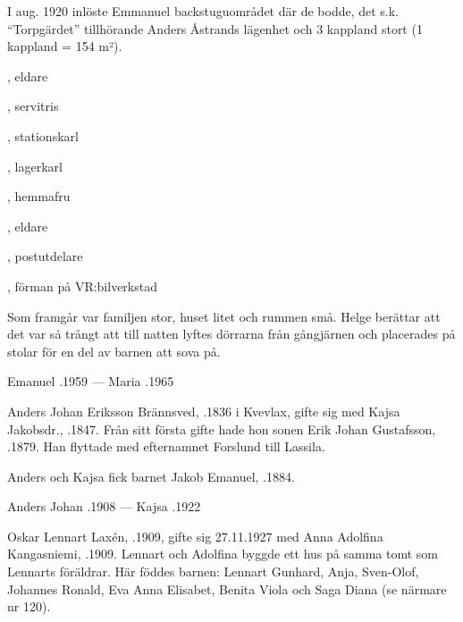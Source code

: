 I aug. 1920 inlöste Emmanuel backstuguområdet där de bodde, det s.k. ``Torpgärdet'' tillhörande Anders Åstrands lägenhet och 3 kappland stort (1 kappland = 154 m²).
\begin{jhchildren}
  \item {}, eldare
  \item {}
  \item {}, servitris
  \item {}, stationskarl
  \item {}, lagerkarl
  \item {}, hemmafru
  \item {}, eldare
  \item {}, postutdelare
  \item {}, förman på VR:bilverkstad
\end{jhchildren}

Som framgår var familjen stor, huset litet och rummen små. Helge berättar att det var så trångt att till natten lyftes dörrarna från gångjärnen och placerades på stolar för en del av barnen att  sova på.

Emanuel .1959  ---  Maria .1965


Anders Johan Eriksson Brännsved, .1836 i Kvevlax, gifte sig med Kajsa Jakobsdr., .1847. Från sitt första gifte hade hon sonen Erik Johan Gustafsson, .1879. Han flyttade med efternamnet  Forslund till Lassila.

Anders och Kajsa fick barnet Jakob Emanuel, .1884.

Anders Johan .1908  ---  Kajsa .1922





Oskar Lennart Laxén, .1909, gifte sig 27.11.1927 med Anna Adolfina Kangasniemi, .1909. Lennart och Adolfina byggde ett hus på samma tomt som Lennarts föräldrar. Här föddes barnen: Lennart Gunhard, Anja, Sven-Olof, Johannes Ronald, Eva Anna Elisabet, Benita Viola och Saga Diana (se närmare nr 120).

